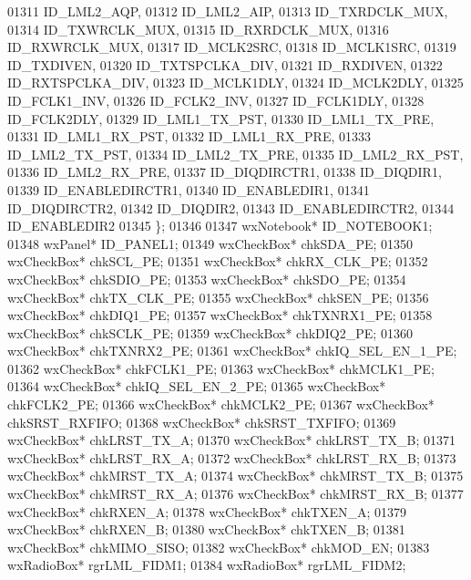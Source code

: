 \begin{DoxyCode}
01311             ID_LML2_AQP,
01312             ID_LML2_AIP,
01313             ID_TXRDCLK_MUX,
01314             ID_TXWRCLK_MUX,
01315             ID_RXRDCLK_MUX,
01316             ID_RXWRCLK_MUX,
01317             ID_MCLK2SRC,
01318             ID_MCLK1SRC,
01319             ID_TXDIVEN,
01320             ID_TXTSPCLKA_DIV,
01321             ID_RXDIVEN,
01322             ID_RXTSPCLKA_DIV,
01323             ID_MCLK1DLY,
01324             ID_MCLK2DLY,
01325             ID_FCLK1_INV,
01326             ID_FCLK2_INV,
01327             ID_FCLK1DLY,
01328             ID_FCLK2DLY,
01329             ID_LML1_TX_PST,
01330             ID_LML1_TX_PRE,
01331             ID_LML1_RX_PST,
01332             ID_LML1_RX_PRE,
01333             ID_LML2_TX_PST,
01334             ID_LML2_TX_PRE,
01335             ID_LML2_RX_PST,
01336             ID_LML2_RX_PRE,
01337             ID_DIQDIRCTR1,
01338             ID_DIQDIR1,
01339             ID_ENABLEDIRCTR1,
01340             ID_ENABLEDIR1,
01341             ID_DIQDIRCTR2,
01342             ID_DIQDIR2,
01343             ID_ENABLEDIRCTR2,
01344             ID\_ENABLEDIR2
01345         \};
01346         
01347         wxNotebook* ID_NOTEBOOK1;
01348         wxPanel* ID_PANEL1;
01349         wxCheckBox* chkSDA_PE;
01350         wxCheckBox* chkSCL_PE;
01351         wxCheckBox* chkRX_CLK_PE;
01352         wxCheckBox* chkSDIO_PE;
01353         wxCheckBox* chkSDO_PE;
01354         wxCheckBox* chkTX_CLK_PE;
01355         wxCheckBox* chkSEN_PE;
01356         wxCheckBox* chkDIQ1_PE;
01357         wxCheckBox* chkTXNRX1_PE;
01358         wxCheckBox* chkSCLK_PE;
01359         wxCheckBox* chkDIQ2_PE;
01360         wxCheckBox* chkTXNRX2_PE;
01361         wxCheckBox* chkIQ_SEL_EN_1_PE;
01362         wxCheckBox* chkFCLK1_PE;
01363         wxCheckBox* chkMCLK1_PE;
01364         wxCheckBox* chkIQ_SEL_EN_2_PE;
01365         wxCheckBox* chkFCLK2_PE;
01366         wxCheckBox* chkMCLK2_PE;
01367         wxCheckBox* chkSRST_RXFIFO;
01368         wxCheckBox* chkSRST_TXFIFO;
01369         wxCheckBox* chkLRST_TX_A;
01370         wxCheckBox* chkLRST_TX_B;
01371         wxCheckBox* chkLRST_RX_A;
01372         wxCheckBox* chkLRST_RX_B;
01373         wxCheckBox* chkMRST_TX_A;
01374         wxCheckBox* chkMRST_TX_B;
01375         wxCheckBox* chkMRST_RX_A;
01376         wxCheckBox* chkMRST_RX_B;
01377         wxCheckBox* chkRXEN_A;
01378         wxCheckBox* chkTXEN_A;
01379         wxCheckBox* chkRXEN_B;
01380         wxCheckBox* chkTXEN_B;
01381         wxCheckBox* chkMIMO_SISO;
01382         wxCheckBox* chkMOD_EN;
01383         wxRadioBox* rgrLML_FIDM1;
01384         wxRadioBox* rgrLML_FIDM2;

\end{DoxyCode}
